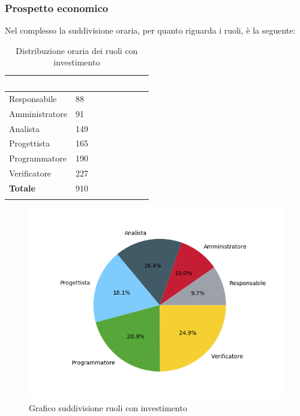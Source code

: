 \subsubsection{Prospetto economico}
Nel complesso la suddivisione oraria, per quanto riguarda i ruoli, è la seguente: 


\begin{longtable}{| C{.30\textwidth}| C{.15\textwidth}| C{.20\textwidth}|}
\hline
{}\textbf{\textcolor{white}{Ruolo}} & \textbf{\textcolor{white}{Ore}} & \textbf{\textcolor{white}{Costo in \euro}} \\
\hline 
Responsabile & 88 & \\
\hline
{}Amministratore & 91 &  \\
\hline
Analista & 149 &  \\
\hline 
{}Progettista & 165 & \\
\hline
Programmatore & 190 &  \\
\hline
{}Verificatore & 227 &  \\
\hline
\textbf{Totale} & 910 &  \\
\hline
\caption{Distribuzione oraria dei ruoli con investimento}
\label{Distribuzione oraria ruoli con investimento}
\end{longtable}

\begin{figure}[H]
	\centering
  		\includegraphics[width=1\linewidth]{./images/torta_toci.png}
  		\caption{Grafico suddivisione ruoli con investimento}
  		\label{fig:grafico suddivione ruoli con investimento}
\end{figure}



